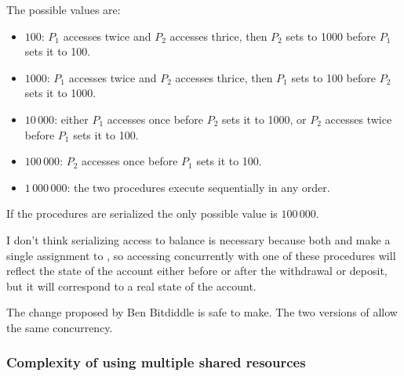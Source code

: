 \begin{exe}[3.40]
    The possible values are:
    \begin{itemize}
        \item $100$: $P_1$ accesses  twice and $P_2$ accesses  
            thrice, then  $P_2$ sets  to 1000 before $P_1$ sets 
            it to 100.
        \item $1000$: $P_1$ accesses  twice and $P_2$ accesses  
            thrice, then  $P_1$ sets  to 100 before $P_2$ sets 
            it to 1000.
        \item $10\,000$: either $P_1$ accesses  once before $P_2$ sets 
            it to 1000, or $P_2$ accesses  twice before $P_1$ sets it to 
            100.
        \item $100\,000$: $P_2$ accesses  once before $P_1$ sets it to 
        100.
        \item $1\,000\,000$: the two procedures execute sequentially in any 
    order.
    \end{itemize}

    If the procedures are serialized the only possible value is $100\,000$.
\end{exe}

\begin{exe}[3.41]
    I don’t think serializing access to balance is necessary because both 
     and  make a single assignment to 
    , so accessing  concurrently with one of these 
    procedures will reflect the state of the account either before or after the 
    withdrawal or deposit, but it will correspond to a real state of the 
    account.
\end{exe}

\begin{exe}[3.42]
    The change proposed by Ben Bitdiddle is safe to make. The two versions of 
     allow the same concurrency.
\end{exe}

\subsubsection{Complexity of using multiple shared resources}

